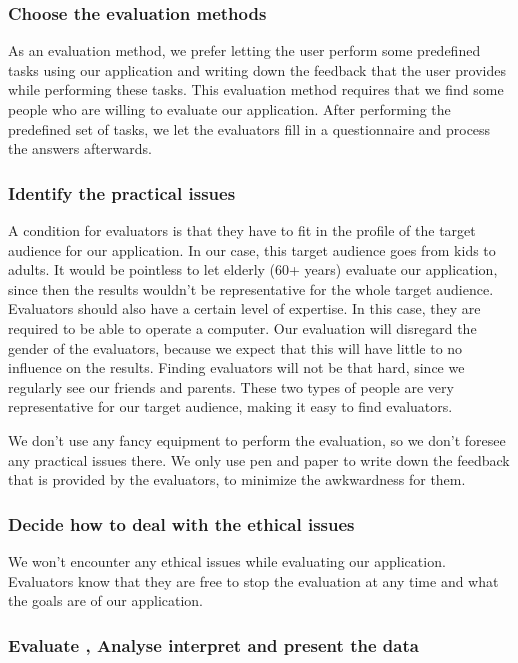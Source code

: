 \documentclass{article}
\begin{document}
\subsubsection{\textbf{C}hoose the evaluation methods}

As an evaluation method, we prefer letting the user perform some predefined tasks using our application and writing down the feedback that the user provides while performing these tasks. This evaluation method requires that we find some people who are willing to evaluate our application. After performing the predefined set of tasks, we let the evaluators fill in a questionnaire and process the answers afterwards.

\subsubsection{\textbf{I}dentify the practical issues}

A condition for evaluators is that they have to fit in the profile of the target audience for our application. In our case, this target audience goes from kids to adults. It would be pointless to let elderly (60+ years) evaluate our application, since then the results wouldn't be representative for the whole target audience. Evaluators should also have a certain level of expertise. In this case, they are required to be able to operate a computer. Our evaluation will disregard the gender of the evaluators, because we expect that this will have little to no influence on the results. Finding evaluators will not be that hard, since we regularly see our friends and parents. These two types of people are very representative for our target audience, making it easy to find evaluators.

We don't use any fancy equipment to perform the evaluation, so we don't foresee any practical issues there. We only use pen and paper to write down the feedback that is provided by the evaluators, to minimize the awkwardness for them.

\subsubsection{\textbf{D}ecide how to deal with the ethical issues}

We won't encounter any ethical issues while evaluating our application. Evaluators know that they are free to stop the evaluation at any time and what the goals are of our application.

\subsubsection{\textbf{E}valuate , Analyse interpret and present the data}
\end{document}
